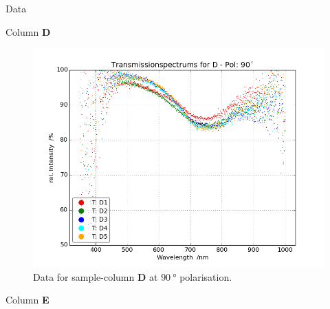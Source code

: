 \begin{appendix}
\begin{chapter}{Data}
\begin{section}{Column \textbf{D}}
\begin{figure}[ht!]
\begin{minipage}{.92\textwidth}
          \includegraphics[width=\textwidth]{Figures/TransspecRAW_DPol90.png}
          \caption{Data for sample-column \textbf{D} at $\SI{90}{\degree}$
              polarisation.}
          \label{fig:TransspecRAW_DPol90}
        \end{minipage}
      \end{figure}
      
    \end{section}
    
    
    
    \newpage
    \begin{section}{Column \textbf{E}}
      \label{Appendix:DataE}
      

\end{section}
\end{chapter}
\end{appendix}
